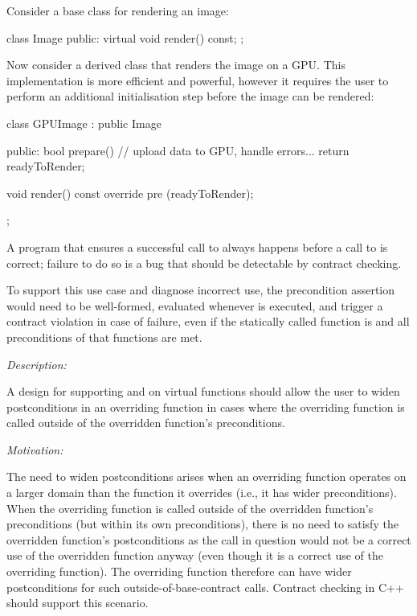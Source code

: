 Consider a base class for rendering an image:

\begin{codeblock}
class Image {
public:
  virtual void render() const;
};
\end{codeblock}

Now consider a derived class that renders the image on a GPU. This implementation is more efficient and powerful, however it requires the user to perform an additional initialisation step before the image can be rendered:

\begin{codeblock}
class GPUImage : public Image {
public:
  bool prepare() { 
    // upload data to GPU, handle errors...
    return readyToRender;
  }
  
  void render() const override
    pre (readyToRender);
};
\end{codeblock}

A program that ensures a successful call to  always happens before a call to  is correct; failure to do so is a bug that should be detectable by contract checking. 

To support this use case and diagnose incorrect use, the precondition assertion \mbox{} would need to be well-formed, evaluated whenever  is executed, and trigger a contract violation in case of failure, even if the statically called function is  and all preconditions of that functions are met.



\emph{Description:}

A design for supporting  and  on virtual functions should allow the user to widen postconditions in an overriding function in cases where the overriding function is called outside of the overridden function's preconditions.

\emph{Motivation:}

The need to widen postconditions arises when an overriding function operates on a larger domain than the function it overrides (i.e., it has wider preconditions). When the overriding function is called outside of the overridden function's preconditions (but within its own preconditions), there is no need to satisfy the overridden function's postconditions as the call in question would not be a correct use of the overridden function anyway (even though it is a correct use of the overriding function). The overriding function therefore can have wider postconditions for such outside-of-base-contract calls. Contract checking in C++ should support this scenario.

